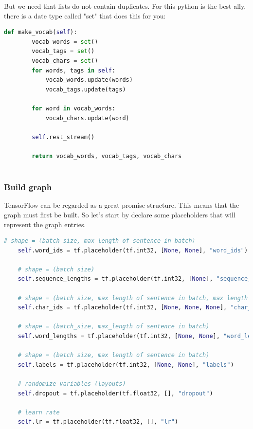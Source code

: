 But we need that lists do not contain duplicates. For this python is the best ally, there is a date type called "set" that does this for you:\\

\begin{lstlisting}[language=Python,caption={Make vocabular}]
    def make_vocab(self):
        vocab_words = set()
        vocab_tags = set()
        vocab_chars = set()
        for words, tags in self:
            vocab_words.update(words)
            vocab_tags.update(tags)

        for word in vocab_words:
            vocab_chars.update(word)

        self.rest_stream()

        return vocab_words, vocab_tags, vocab_chars
        
\end{lstlisting}

\subsubsection{Build graph}

TensorFlow can be regarded as a great promise structure. This means that the graph must first be built. So let's start by declare some placeholders that will represent the graph entries.

\begin{lstlisting}[language=Python,caption={Add placeholders}]
    # shape = (batch size, max length of sentence in batch)
    self.word_ids = tf.placeholder(tf.int32, [None, None], "word_ids")
    
    # shape = (batch size)
    self.sequence_lengths = tf.placeholder(tf.int32, [None], "sequence_lengths")
    
    # shape = (batch size, max length of sentence in batch, max length of word in sentence)
    self.char_ids = tf.placeholder(tf.int32, [None, None, None], "char_ids")
    
    # shape = (batch_size, max_length of sentence in batch)
    self.word_lengths = tf.placeholder(tf.int32, [None, None], "word_lengths")
    
    # shape = (batch size, max length of sentence in batch)
    self.labels = tf.placeholder(tf.int32, [None, None], "labels")
    
    # randomize variables (layouts)
    self.dropout = tf.placeholder(tf.float32, [], "dropout")
    
    # learn rate
    self.lr = tf.placeholder(tf.float32, [], "lr")
        
\end{lstlisting}

